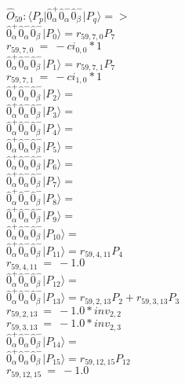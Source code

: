 \documentclass[14pt]{article}
\begin{document}
    $\hat{O}_{59}:  \langle{P_p}\vert \hat{0}_{\alpha}^{+}\hat{0}_{\alpha}^{-}\hat{0}_{\beta}^{-} \vert{P_q}\rangle => $ \\ 
    $ \hat{0}_{\alpha}^{+}\hat{0}_{\alpha}^{-}\hat{0}_{\beta}^{-} \vert{P_{0}}\rangle = {r}_{59,7,0}P_{7} $ \\ 
    ${r}_{59,7,0}\ =\ -{ci}_{0,0}*1 $ \\ 
    $ \hat{0}_{\alpha}^{+}\hat{0}_{\alpha}^{-}\hat{0}_{\beta}^{-} \vert{P_{1}}\rangle = {r}_{59,7,1}P_{7} $ \\ 
    ${r}_{59,7,1}\ =\ -{ci}_{1,0}*1 $ \\ 
    $ \hat{0}_{\alpha}^{+}\hat{0}_{\alpha}^{-}\hat{0}_{\beta}^{-} \vert{P_{2}}\rangle =  $ \\ 
    $ \hat{0}_{\alpha}^{+}\hat{0}_{\alpha}^{-}\hat{0}_{\beta}^{-} \vert{P_{3}}\rangle =  $ \\ 
    $ \hat{0}_{\alpha}^{+}\hat{0}_{\alpha}^{-}\hat{0}_{\beta}^{-} \vert{P_{4}}\rangle =  $ \\ 
    $ \hat{0}_{\alpha}^{+}\hat{0}_{\alpha}^{-}\hat{0}_{\beta}^{-} \vert{P_{5}}\rangle =  $ \\ 
    $ \hat{0}_{\alpha}^{+}\hat{0}_{\alpha}^{-}\hat{0}_{\beta}^{-} \vert{P_{6}}\rangle =  $ \\ 
    $ \hat{0}_{\alpha}^{+}\hat{0}_{\alpha}^{-}\hat{0}_{\beta}^{-} \vert{P_{7}}\rangle =  $ \\ 
    $ \hat{0}_{\alpha}^{+}\hat{0}_{\alpha}^{-}\hat{0}_{\beta}^{-} \vert{P_{8}}\rangle =  $ \\ 
    $ \hat{0}_{\alpha}^{+}\hat{0}_{\alpha}^{-}\hat{0}_{\beta}^{-} \vert{P_{9}}\rangle =  $ \\ 
    $ \hat{0}_{\alpha}^{+}\hat{0}_{\alpha}^{-}\hat{0}_{\beta}^{-} \vert{P_{10}}\rangle =  $ \\ 
    $ \hat{0}_{\alpha}^{+}\hat{0}_{\alpha}^{-}\hat{0}_{\beta}^{-} \vert{P_{11}}\rangle = {r}_{59,4,11}P_{4} $ \\ 
    ${r}_{59,4,11}\ =\ -1.0 $ \\ 
    $ \hat{0}_{\alpha}^{+}\hat{0}_{\alpha}^{-}\hat{0}_{\beta}^{-} \vert{P_{12}}\rangle =  $ \\ 
    $ \hat{0}_{\alpha}^{+}\hat{0}_{\alpha}^{-}\hat{0}_{\beta}^{-} \vert{P_{13}}\rangle = {r}_{59,2,13}P_{2}+{r}_{59,3,13}P_{3} $ \\ 
    ${r}_{59,2,13}\ =\ -1.0*{inv}_{2,2} $ \\ 
    ${r}_{59,3,13}\ =\ -1.0*{inv}_{2,3} $ \\ 
    $ \hat{0}_{\alpha}^{+}\hat{0}_{\alpha}^{-}\hat{0}_{\beta}^{-} \vert{P_{14}}\rangle =  $ \\ 
    $ \hat{0}_{\alpha}^{+}\hat{0}_{\alpha}^{-}\hat{0}_{\beta}^{-} \vert{P_{15}}\rangle = {r}_{59,12,15}P_{12} $ \\ 
    ${r}_{59,12,15}\ =\ -1.0 $ \\ 
    
\end{document}
